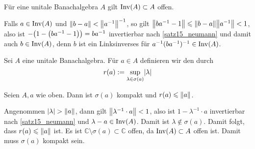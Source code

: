 \begin{korollar}[{name=[Invertierbare Elemente bilden offene Menge]},label=inv_offen]
	Für eine unitale Banachalgebra $A$ gilt $\operatorname{Inv}(A) \subset A$ offen.
\end{korollar}
\begin{beweis}
	Falls $a \in \operatorname{Inv}(A)$ und $\norm{b-a} < \norm{a^{-1}}^{-1}$, so gilt $\norm{b a^{-1} -1} \le \norm{b-a} \norm{a^{-1}}<1$, also ist 
	$-\enbrace*{1- \enbrace*{ba^{-1} -1}} = ba^{-1}$ invertierbar nach \autoref{satz15_neumann} und damit auch $b \in \operatorname{Inv}(A)$, denn $b$ ist ein Linksinverses für 
	$a^{-1}(ba^{-1})^{-1} \in \operatorname{Inv}(A)$.
\end{beweis}

\begin{definition}[{name=[Spektralradius]}]
	Sei $A$ eine unitale Banachalgebra. Für $a \in A$ definieren wir den  durch
	\[
		r(a) := \sup_{\lambda \in \sigma(a)} \lvert\lambda\rvert 
	\] 
\end{definition}

\begin{proposition}[{name=[Spektrum ist kompakt und Spektralradius durch Norm beschränkt]},label=spec_kompakt]
	Seien $A,a$ wie oben. Dann ist $\sigma(a)$ kompakt und $r(a) \le \norm{a}$.
\end{proposition}
\begin{beweis}
	Angenommen $\abs{\lambda} > \norm{a}$, dann gilt $\norm{\lambda^{-1} \cdot a} < 1$, also ist $1- \lambda^{-1} \cdot a$ invertierbar nach \autoref{satz15_neumann} und 
	$\lambda -a \in \operatorname{Inv}(A)$. Damit ist $\lambda \notin \sigma(a)$. Damit folgt, dass $r(a) \le \norm{a}$ ist. 	
	Es ist $\mathds{C} \setminus \sigma(a) \subset \mathds{C}$ offen, da $\operatorname{Inv}(A) \subset A$ offen ist. Damit muss $\sigma(a)$ kompakt sein.
\end{beweis}

